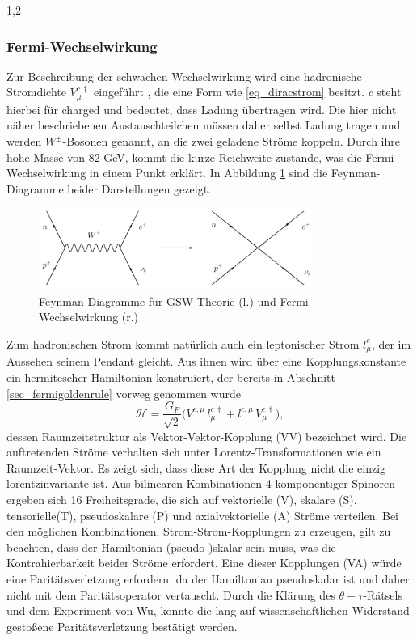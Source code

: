 \documentclass[11pt,a4paper,twoside]{report}
\begin{document}
\begin{spacing}{1,2}
\subsubsection{Fermi-Wechselwirkung}
\label{sec_fermiWW}
Zur Beschreibung der schwachen Wechselwirkung wird eine hadronische Stromdichte $V_\mu^{c\,\dagger}$ eingeführt \cite{Klapdor}, die eine Form wie 
\eqref{eq_diracstrom} besitzt. 
$c$ steht hierbei für charged und bedeutet, dass Ladung
übertragen wird. Die hier nicht näher beschriebenen Austauschteilchen müssen daher selbst Ladung tragen und werden $W^\pm$-Bosonen genannt, an die zwei 
geladene Ströme koppeln. Durch ihre hohe Masse von 82 GeV, kommt die kurze Reichweite zustande, was die Fermi-Wechselwirkung in einem Punkt erklärt. In
Abbildung \ref{pic_4fermi} sind die Feynman-Diagramme beider Darstellungen gezeigt.
\begin{figure}[H]
\includegraphics[width=0.8\textwidth]{Abbildungen/4fermi.jpg}
\caption{Feynman-Diagramme für GSW-Theorie (l.) und Fermi-Wechselwirkung (r.)}
\label{pic_4fermi}
\end{figure}
Zum hadronischen Strom kommt natürlich auch ein leptonischer Strom $l_\mu^c$, der im Aussehen seinem Pendant gleicht. Aus ihnen wird über eine Kopplungskonstante
ein hermitescher Hamiltonian konstruiert, der bereits in Abschnitt \ref{sec_fermigoldenrule} vorweg genommen wurde
\begin{equation}
 \mathcal{H} = \frac{G_F}{\sqrt{2}}\big(V^{c,\mu}\,l_\mu^{c\,\dagger} + l^{c,\mu}\,V_\mu^{c\,\dagger}\big),
\end{equation}
dessen Raumzeitstruktur als Vektor-Vektor-Kopplung (VV) bezeichnet wird. Die auftretenden Ströme verhalten sich unter Lorentz-Transformationen wie ein Raumzeit-Vektor.
Es zeigt sich, dass diese Art der Kopplung nicht die einzig lorentzinvariante ist. Aus bilinearen Kombinationen 4-komponentiger Spinoren ergeben sich 16 Freiheitsgrade,
die sich auf vektorielle (V), skalare (S), tensorielle(T), pseudoskalare (P) und axialvektorielle (A) Ströme verteilen. Bei den möglichen Kombinationen, Strom-Strom-Kopplungen zu erzeugen, gilt zu beachten, dass
der Hamiltonian (pseudo-)skalar sein muss, was die Kontrahierbarkeit beider Ströme erfordert. Eine dieser Kopplungen (VA) würde eine Paritätsverletzung erfordern,
da der Hamiltonian pseudoskalar ist und daher nicht mit dem Paritätsoperator vertauscht. Durch die Klärung des $\theta-\tau$-Rätsels und dem Experiment von Wu,
konnte die lang auf wissenschaftlichen Widerstand gestoßene Paritätsverletzung bestätigt werden.


\end{spacing}
\end{document}
